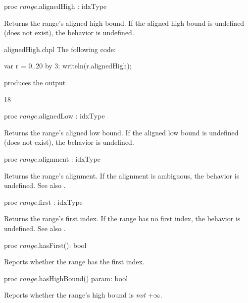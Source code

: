 \begin{protohead}
proc $range$.alignedHigh : idxType
\end{protohead}
\begin{protobody}
Returns the range's aligned high bound.
If the aligned high bound is undefined (does not exist),
the behavior is undefined.
\end{protobody}
\begin{chapelexample}{alignedHigh.chpl}
The following code:
\begin{chapel}
var r = 0..20 by 3;
writeln(r.alignedHigh);
\end{chapel}
produces the output
\begin{chapelprintoutput}
18
\end{chapelprintoutput}
\end{chapelexample}

\begin{protohead}
proc $range$.alignedLow : idxType
\end{protohead}
\begin{protobody}
Returns the range's aligned low bound.
If the aligned low bound is undefined (does not exist),
the behavior is undefined.
\end{protobody}

\begin{protohead}
proc $range$.alignment : idxType
\end{protohead}
\begin{protobody}
Returns the range's alignment.
If the alignment is ambiguous, the behavior is undefined.
See also .
\end{protobody}

\begin{protohead}
proc $range$.first : idxType
\end{protohead}
\begin{protobody}
Returns the range's first index.
If the range has no first index, the behavior is undefined.
See also .
\end{protobody}

\begin{protohead}
proc $range$.hasFirst(): bool
\end{protohead}
\begin{protobody}
Reports whether the range has the first index.
\end{protobody}

\begin{protohead}
proc $range$.hasHighBound() param: bool
\end{protohead}
\begin{protobody}
Reports whether the range's high bound is \emph{not} +$\infty$.
\end{protobody}

